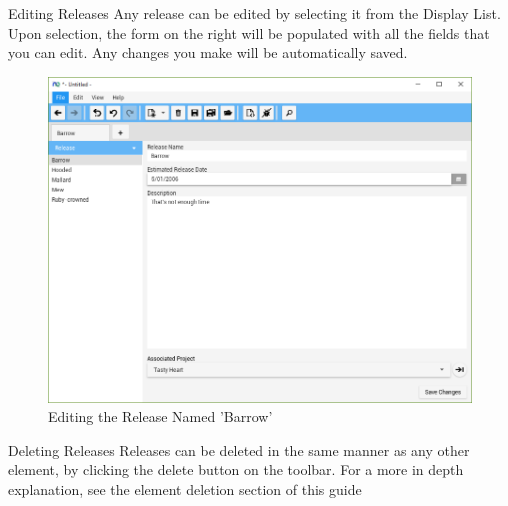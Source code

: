 Editing Releases
\newline
Any release can be edited by selecting it from the Display List. Upon selection, the form on the right will be populated with all the fields that you can edit. Any changes you make will be automatically saved.

\begin{figure}[H]
\centering
\includegraphics[width=\textwidth]{images/screenshots/releases4.PNG}
\caption{Editing the Release Named 'Barrow'}
\label{fig:new_project}
\end{figure}

Deleting Releases
\newline
Releases can be deleted in the same manner as any other element, by clicking the delete button on the toolbar. For a more in depth explanation, see the element deletion section of this guide

